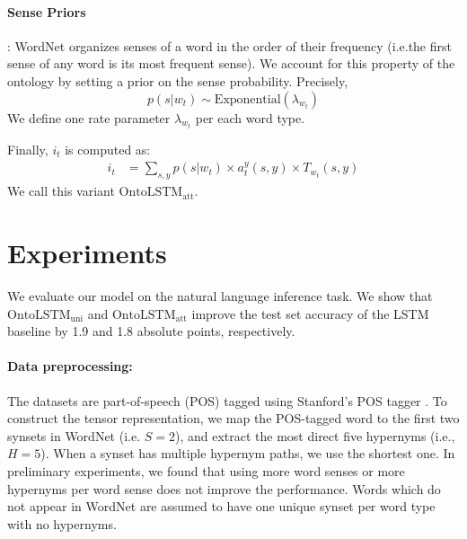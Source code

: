 \paragraph{Sense Priors}: WordNet organizes senses of a word in the order of their frequency (i.e.the first sense of any word is its most frequent sense). We account for this property of the ontology by setting a prior on the sense probability. Precisely,
\begin{equation*}
    p(s|w_t) \sim \text{Exponential}(\lambda_{w_t})
\end{equation*}
We define one rate parameter $\lambda_{w_t}$ per each word type.

Finally, $i_t$ is computed as:
\begin{align}
i_t &= \sum_{s, y} p(s|w_t) \times a_t^y(s,y) \times T_{w_t}(s,y) \nonumber
\end{align}
We call this variant \textbf{$\text{OntoLSTM}_{\text{att}}$}.

\section{Experiments}
\label{sec:ontolstm_experiments}
We evaluate our model on the natural language inference task.
We show that $\text{OntoLSTM}_{\text{uni}}$ and $\text{OntoLSTM}_{\text{att}}$ improve the test set accuracy of the LSTM baseline by 1.9 and 1.8 absolute points, respectively.

\paragraph{Data preprocessing:} The datasets are part-of-speech (POS) tagged using Stanford's POS tagger \citep{toutanova:03}.
To construct the tensor representation, we map the POS-tagged word to the first two synsets in WordNet (i.e. $S=2$), and extract the most direct five hypernyms (i.e., $H=5$). When a synset has multiple hypernym paths, we use the shortest one. In preliminary experiments, we found that using more word senses or more hypernyms per word sense does not improve the performance.
Words which do not appear in WordNet are assumed to have one unique synset per word type with no hypernyms.

